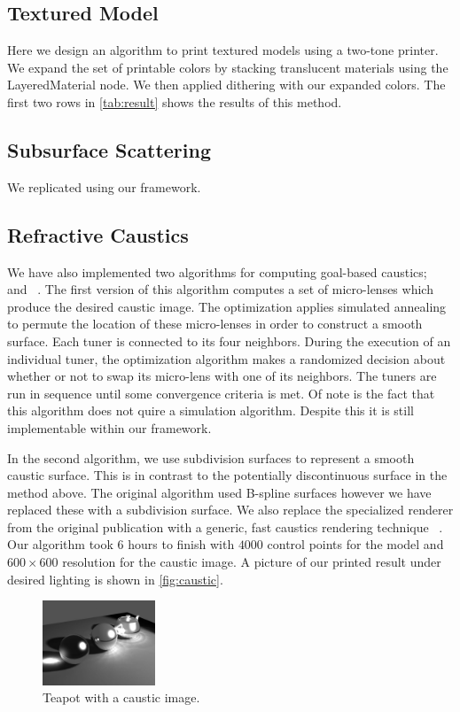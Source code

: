 \documentclass[annual]{acmsiggraph}
\begin{document}
\subsection{Textured Model}
Here we design an algorithm to print textured models using a two-tone printer. We expand the set of printable colors by stacking translucent materials using the LayeredMaterial node. We then applied dithering with our expanded colors. 
The first two rows in \autoref{tab:result} shows the results of this method.
\subsection{Subsurface Scattering}
We replicated \cite{Hasan:2010} using our framework. 

\subsection{Refractive Caustics}
We have also implemented two algorithms for computing goal-based caustics;  ~\cite{Marios:2011} and ~\cite{Finckh:2010}.
The first version of this algorithm computes  a set of micro-lenses which produce the desired caustic image. 
The optimization applies simulated annealing to permute the location of these micro-lenses in order to construct a smooth surface.
Each tuner is connected to its four neighbors.
During the execution of an individual tuner, the optimization algorithm makes a randomized decision about
 whether or not to swap its micro-lens with one of its neighbors.
The tuners are run in sequence until some convergence criteria is met.
Of note is the fact that this algorithm does not quire a simulation algorithm. 
Despite this it is still implementable within our framework. 

In the second algorithm, we use subdivision surfaces to represent a smooth caustic surface. 
This is in contrast to the potentially discontinuous surface in the method above. 
The original algorithm used B-spline surfaces however we have replaced these with a subdivision surface. 
We also replace the specialized renderer from the original publication with a generic, fast caustics rendering technique ~\cite{Yuksel:2009}. Our algorithm took 6 hours to finish with $4000$ control points for the model and $600\times 600$ resolution for the caustic image.  A picture of our printed result under desired lighting is shown in \autoref{fig:caustic}.
\begin{figure}
	\centering
 	\includegraphics[width=0.3\textwidth]{figure/caustic.jpg}
\caption{Teapot with a caustic image.}
\label{fig:caustic}
\end{figure}
\end{document}

